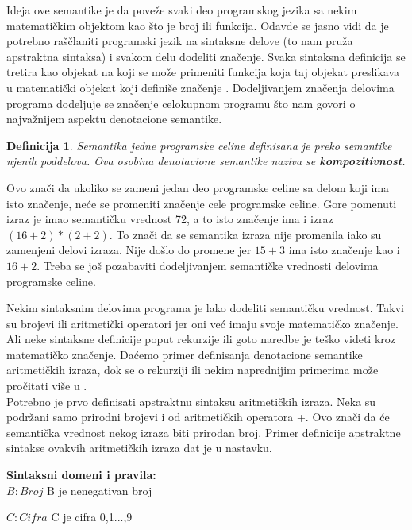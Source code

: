 \documentclass[a4paper]{article}
\newtheorem{definicija}{Definicija}[section]
\begin{document}
{Ideja ove semantike je da poveže svaki deo programskog jezika sa nekim matematičkim objektom kao što je broj ili funkcija. Odavde se jasno vidi da je potrebno raščlaniti programski jezik na sintaksne delove (to nam pruža apstraktna sintaksa) i svakom delu dodeliti značenje. Svaka sintaksna definicija se tretira kao objekat na koji se može primeniti funkcija koja taj objekat preslikava u matematički objekat koji definiše značenje \cite{parezanovic}. Dodeljivanjem značenja delovima programa dodeljuje se značenje celokupnom programu što nam govori o najvažnijem aspektu denotacione semantike.
\begin{definicija}
Semantika jedne programske celine definisana je preko semantike njenih poddelova. Ova osobina denotacione semantike naziva se \textbf{kompozitivnost}.
\end{definicija}

Ovo znači da ukoliko se zameni jedan deo programske celine sa delom koji ima isto značenje, neće se promeniti značenje cele programske celine. Gore pomenuti izraz je imao semantičku vrednost 72, a to isto značenje ima i izraz $ (16+2)*(2+2) $. To znači da se semantika izraza nije promenila iako su zamenjeni delovi izraza. Nije došlo do promene jer $ 15+3 $ ima isto značenje kao i $ 16+2 $. Treba se još pozabaviti dodeljivanjem semantičke vrednosti delovima programske celine.

Nekim sintaksnim delovima programa je lako dodeliti semantičku vrednost. Takvi su brojevi ili aritmetički operatori jer oni već imaju svoje matematičko značenje. Ali neke sintaksne definicije poput rekurzije ili goto naredbe je teško videti kroz matematičko značenje. Daćemo primer definisanja denotacione semantike aritmetičkih izraza, dok se o rekurziji ili nekim naprednijim primerima može pročitati više u \cite{nielson}.\\


Potrebno je prvo definisati apstraktnu sintaksu aritmetičkih izraza. Neka su podržani samo prirodni brojevi i od aritmetičkih operatora +. Ovo znači da će semantička vrednost nekog izraza biti prirodan broj. Primer definicije apstraktne sintakse ovakvih aritmetičkih izraza dat je u nastavku.


\begin{tcolorbox}
\textbf{Sintaksni domeni i pravila:}
\\

$B: Broj $  \qquad\quad B je nenegativan broj

$C: Cifra $ \qquad\quad C je cifra 0,1...,9


\end{tcolorbox}}
\end{document}
